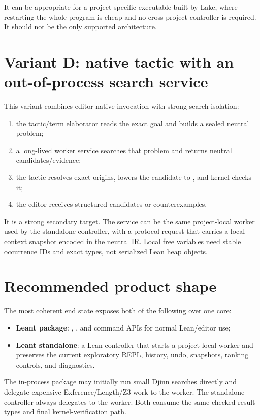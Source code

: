 \documentclass[10pt,letterpaper,oneside]{report}
\newcommand{\code}[1]{\texttt{\detokenize{#1}}}
\newcommand{\term}[1]{\textbf{#1}}
\begin{document}
It can be appropriate for a project-specific executable built by Lake, where restarting the whole program is cheap and no cross-project controller is required. It should not be the only supported architecture.

\section{Variant D: native tactic with an out-of-process search service}

This variant combines editor-native invocation with strong search isolation:

\begin{enumerate}
  \item the tactic/term elaborator reads the exact goal and builds a sealed neutral problem;
  \item a long-lived worker service searches that problem and returns neutral candidates/evidence;
  \item the tactic resolves exact origins, lowers the candidate to \code{Expr}, and kernel-checks it;
  \item the editor receives structured candidates or counterexamples.
\end{enumerate}

It is a strong secondary target. The service can be the same project-local worker used by the standalone controller, with a protocol request that carries a local-context snapshot encoded in the neutral IR. Local free variables need stable occurrence IDs and exact types, not serialized Lean heap objects.

\section{Recommended product shape}

The most coherent end state exposes both of the following over one core:

\begin{itemize}
  \item \term{Leant package}: \code{leant}, \code{leant?}, and command APIs for normal Lean/editor use;
  \item \term{Leant standalone}: a Lean controller that starts a project-local worker and preserves the current exploratory REPL, history, undo, snapshots, ranking controls, and diagnostics.
\end{itemize}

The in-process package may initially run small Djinn searches directly and delegate expensive Exference/Length/Z3 work to the worker. The standalone controller always delegates to the worker. Both consume the same checked result types and final kernel-verification path.
\end{document}
